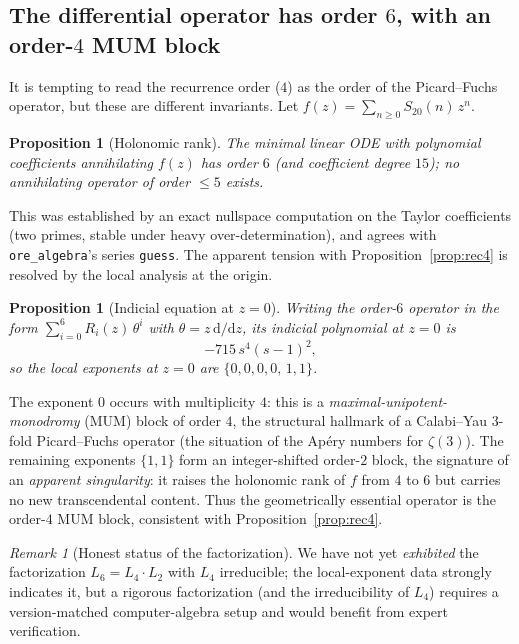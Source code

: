 \documentclass[11pt,a4paper]{article}
\newtheorem{proposition}[theorem]{Proposition}
\theoremstyle{definition}
\theoremstyle{remark}
\newtheorem{remark}[theorem]{Remark}
\newcommand{\Sx}{S_{20}}
\begin{document}
\subsection{The differential operator has order $6$, with an order-$4$ MUM block}

It is tempting to read the recurrence order ($4$) as the order of the
Picard--Fuchs operator, but these are different invariants. Let
$f(z)=\sum_{n\ge0}\Sx(n)\,z^n$.

\begin{proposition}[Holonomic rank]\label{prop:ode6}
The minimal linear ODE with polynomial coefficients annihilating $f(z)$ has order
$6$ (and coefficient degree $15$); no annihilating operator of order $\le 5$
exists.
\end{proposition}

\noindent This was established by an exact nullspace computation on the Taylor
coefficients (two primes, stable under heavy over-determination), and agrees with
\texttt{ore\_algebra}'s series \texttt{guess}. The apparent tension with
Proposition~\ref{prop:rec4} is resolved by the local analysis at the origin.

\begin{proposition}[Indicial equation at $z=0$]\label{prop:indicial}
Writing the order-$6$ operator in the form $\sum_{i=0}^{6}R_i(z)\,\theta^i$ with
$\theta=z\,\mathrm d/\mathrm dz$, its indicial polynomial at $z=0$ is
\[
  -715\,s^{4}(s-1)^{2},
\]
so the local exponents at $z=0$ are $\{0,0,0,0,\,1,1\}$.
\end{proposition}

\noindent The exponent $0$ occurs with multiplicity $4$: this is a
\emph{maximal-unipotent-monodromy} (MUM) block of order $4$, the structural
hallmark of a Calabi--Yau $3$-fold Picard--Fuchs operator (the situation of the
Ap\'ery numbers for $\zeta(3)$). The remaining exponents $\{1,1\}$ form an
integer-shifted order-$2$ block, the signature of an \emph{apparent singularity}:
it raises the holonomic rank of $f$ from $4$ to $6$ but carries no new
transcendental content. Thus the geometrically essential operator is the
order-$4$ MUM block, consistent with Proposition~\ref{prop:rec4}.

\begin{remark}[Honest status of the factorization]
We have not yet \emph{exhibited} the factorization $L_6=L_4\cdot L_2$ with $L_4$
irreducible; the local-exponent data strongly indicates it, but a rigorous
factorization (and the irreducibility of $L_4$) requires a version-matched
computer-algebra setup and would benefit from expert verification.
\end{remark}
\end{document}
